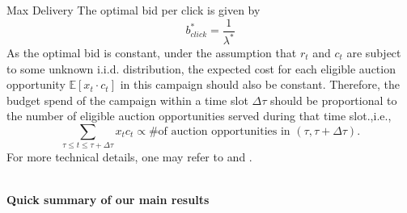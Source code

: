 \documentclass[../main.tex]{subfiles}
\begin{document}
\begin{section}{Max Delivery}
	The optimal bid per click is given by 
	\begin{equation}
		b^*_{click} = \frac{1}{\lambda^*}
	\end{equation}
	As the optimal bid is constant, under the assumption that \(r_t\) and \(c_t\) are subject to some unknown i.i.d. distribution, the expected cost for each eligible auction opportunity \( \mathbb{E} \left[x_t \cdot c_t \right]\) in this campaign should also be constant. Therefore, the budget spend of the campaign within a time slot \(\Delta \tau\) should be proportional to the number of eligible auction opportunities served during that time slot.,i.e.,
	\[
	\sum_{\tau \leq t \leq \tau + \Delta \tau} x_t c_t \propto  \text{\# of auction opportunities in } (\tau, \tau + \Delta \tau).
	\]
	For more technical details, one may refer to \cite{lee2013real} and \cite{wang2017display}.

	\textbf{\\Quick summary of our main results}
	
	\end{section}
	
\end{document}
